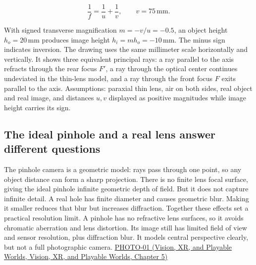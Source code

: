 \[
\frac{1}{f}=\frac{1}{u}+\frac{1}{v},\qquad v=75\,\mathrm{mm}.
\]

With signed transverse magnification \(m=-v/u=-0.5\), an object height \(h_o=20\,\mathrm{mm}\) produces image height \(h_i=mh_o=-10\,\mathrm{mm}\). The minus sign indicates inversion. The drawing uses the same millimeter scale horizontally and vertically. It shows three equivalent principal rays: a ray parallel to the axis refracts through the rear focus \(F'\), a ray through the optical center continues undeviated in the thin-lens model, and a ray through the front focus \(F\) exits parallel to the axis. Assumptions: paraxial thin lens, air on both sides, real object and real image, and distances \(u,v\) displayed as positive magnitudes while image height carries its sign.

\subsection{The ideal pinhole and a real lens answer different questions}\label{03-visual-computing-i-ch003-the-ideal-pinhole-and-a-real-lens-answer-different-questions}

The pinhole camera is a geometric model: rays pass through one point, so any object distance can form a sharp projection. There is no finite lens focal surface, giving the ideal pinhole infinite geometric depth of field. But it does not capture infinite detail. A real hole has finite diameter and causes geometric blur. Making it smaller reduces that blur but increases diffraction. Together these effects set a practical resolution limit. A pinhole has no refractive lens surfaces, so it avoids chromatic aberration and lens distortion. Its image still has limited field of view and sensor resolution, plus diffraction blur. It models central perspective clearly, but not a full photographic camera. \href{../07-Vision-XR-and-Playable-Worlds/main.pdf\#nameddest=04-visual-computing-ii-ch036-photo-01---photography-session-01}{PHOTO-01 (Vision, XR, and Playable Worlds, Vision, XR, and Playable Worlds, Chapter 5)}

